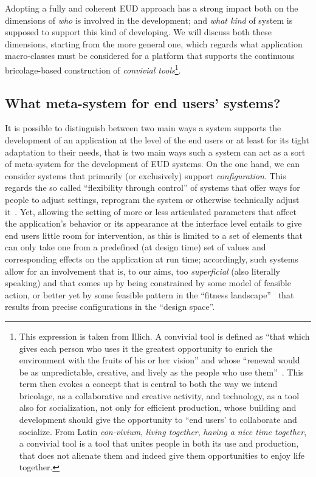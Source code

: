 \documentclass{article}
\begin{document}
Adopting a fully and coherent EUD approach has a strong impact both on the dimensions of \emph{who} is involved in the development; and \emph{what kind} of system is supposed to support this kind of developing. We will discuss both these dimensions, starting from the more general one, which regards what application macro-classes must be considered for a platform that supports the continuous bricolage-based construction of \emph{convivial tools}\footnote{This expression is taken from Illich. A convivial tool is defined as ``that which gives each person who uses it the greatest opportunity to enrich the environment with the fruits of his or her vision'' and whose ``renewal would be as unpredictable, creative, and lively as the people who use them''~\cite{illich_tools_1973}. This term then evokes a concept that is central to both the way we intend bricolage, as a collaborative and creative activity, and technology, as a tool also for socialization, not only for efficient production, whose building and development should give the opportunity to ``end users' to collaborate and socialize. From Latin \emph{con-vivium}, \emph{living together}, \emph{having a nice time together}, a convivial tool is a tool that unites people in both its use and production, that does not alienate them and indeed give them opportunities to enjoy life together.}. 

\subsection{What meta-system for end users' systems?}

It is possible to distinguish between two main ways a system supports the development of an application at the level of the end users or at least for its tight adaptation to their needs, that is two main ways such a system can act as a sort of meta-system for the development of EUD systems. On the one hand, we can consider systems that primarily (or exclusively) support \emph{configuration}. This regards the so called ``flexibility through control'' of systems that offer ways for people to adjust settings, reprogram the system or otherwise technically adjust it~\citep{dourish_evolution_1999}. Yet, allowing the setting of more or less articulated parameters that affect the application's behavior or its appearance at the interface level entails to give end users little room for intervention, as this is limited to a set of elements that can only take one from a predefined (at design time) set of values and corresponding effects on the application at run time; accordingly, such systems allow for an involvement that is, to our aims, too \emph{superficial} (also literally speaking) and that comes up by being constrained by some model of feasible action, or better yet by some feasible pattern in the ``fitness landscape''~\citep[p. 50]{mansfield_nature_2010} that results from precise configurations in the ``design space''.
\end{document}
